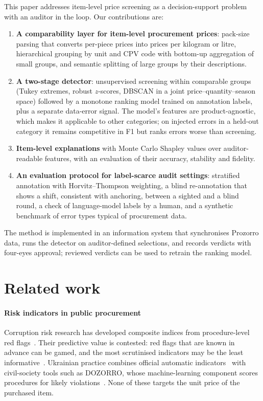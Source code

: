 \documentclass[conference]{IEEEtran}
\begin{document}
This paper addresses item-level price screening as a decision-support problem with an auditor in the
loop. Our contributions are:
\begin{enumerate}
  \item \textbf{A comparability layer for item-level procurement prices}: pack-size parsing that converts
  per-piece prices into prices per kilogram or litre, hierarchical grouping by unit and CPV code with
  bottom-up aggregation of small groups, and semantic splitting of large groups by their descriptions.
  \item \textbf{A two-stage detector}: unsupervised screening within comparable groups (Tukey extremes,
  robust $z$-scores, DBSCAN in a joint price--quantity--season space) followed by a monotone ranking model
  trained on annotation labels, plus a separate data-error signal. The model's features are
  product-agnostic, which makes it applicable to other categories; on injected errors in a held-out
  category it remains competitive in F1 but ranks errors worse than screening.
  \item \textbf{Item-level explanations} with Monte Carlo Shapley values over auditor-readable features,
  with an evaluation of their accuracy, stability and fidelity.
  \item \textbf{An evaluation protocol for label-scarce audit settings}: stratified annotation with
  Horvitz--Thompson weighting, a blind re-annotation that shows a shift, consistent with anchoring, between a
  sighted and a blind round, a check of language-model labels by a human, and a synthetic benchmark of error types
  typical of procurement data.
\end{enumerate}
The method is implemented in an information system that synchronises Prozorro data, runs the detector on
auditor-defined selections, and records verdicts with four-eyes approval; reviewed verdicts can be used to
retrain the ranking model.

\section{Related work}

\paragraph{Risk indicators in public procurement} Corruption risk research has developed composite
indices from procedure-level red flags~\cite{fazekas2016objective,gti2024indicators}. Their predictive
value is contested: red flags that are known in advance can be gamed, and the most scrutinised indicators
may be the least informative~\cite{decarolis2022redflags}. Ukrainian practice combines official automatic
indicators~\cite{minfin2024indicators} with civil-society tools such as DOZORRO, whose machine-learning
component scores procedures for likely violations~\cite{tiu2018dozorro}. None of these targets the unit
price of the purchased item.
\end{document}
